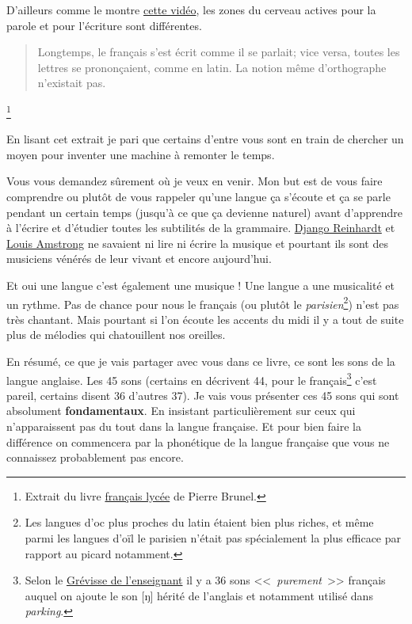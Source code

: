 \documentclass[12pt,a4paper]{book}
\begin{document}
D'ailleurs comme le montre \href{https://youtu.be/Wn\_eBrIDUuc}{cette vidéo}, les zones du cerveau actives
pour la parole et pour l'écriture sont différentes.\par

\begin{quote}
Longtemps, le français s'est écrit comme il se parlait; vice versa,
toutes les lettres se prononçaient, comme en latin. La notion même
d'orthographe n'existait pas.
\end{quote}\footnote{Extrait du livre
\href{https://www.amazon.fr/gp/product/2844100015/ref=as\_li\_tl?ie=UTF8\&camp=1642\&creative=6746\&creativeASIN=2844100015\&linkCode=as2\&tag=wwwbecomefree-21\&linkId=985f3a849fd44728e8480993cf2d5490}{français
  lycée} de Pierre Brunel.}


En lisant cet extrait je pari que certains d'entre vous sont en train
de chercher un moyen pour inventer une machine à remonter le temps. 

Vous vous demandez sûrement où je veux en venir. Mon but est de vous
faire comprendre ou plutôt de vous rappeler qu'une langue ça s'écoute
et ça se parle pendant un certain temps (jusqu'à ce que ça devienne
naturel) avant d'apprendre à l'écrire et d'étudier toutes les
subtilités de la grammaire. \href{https://fr.wikipedia.org/wiki/Django\_Reinhardt}{Django Reinhardt} et \href{https://fr.wikipedia.org/wiki/Louis\_Armstrong}{Louis Amstrong} ne
savaient ni lire ni écrire la musique et pourtant ils sont des
musiciens vénérés de leur vivant et encore aujourd'hui.\par

Et oui une langue c'est également une musique ! Une langue a une
musicalité et un rythme. Pas de chance pour nous le français (ou
plutôt le \emph{parisien}\footnote{Les langues d'oc plus proches du
  latin étaient bien plus riches, et même parmi les langues d'oïl le
  parisien n'était pas spécialement la plus efficace par rapport au
  picard notamment.})
n'est pas très chantant. Mais pourtant si l'on écoute les accents du
midi il y a tout de suite plus de mélodies qui chatouillent nos
oreilles. 

En résumé, ce que je vais partager avec vous dans ce livre, ce
sont les sons de la langue anglaise. Les 45 sons (certains en
décrivent 44, pour le français\footnote{Selon le
  \href{https://www.amazon.fr/gp/product/221010632X/ref=as_li_tl?ie=UTF8&camp=1642&creative=6746&creativeASIN=221010632X&linkCode=as2&tag=wwwbecomefree-21&linkId=c8c522ee07ffc9188dd9a768e39d88e0}{Grévisse
  de l'enseignant} il y a 36 sons <<~\emph{purement}~>> français
auquel on ajoute le son [ŋ] hérité de l'anglais et notamment utilisé dans \emph{parking}.} c'est pareil, certains disent 36
d'autres 37). Je vais vous présenter ces 45 sons qui sont absolument
\textbf{fondamentaux}. En insistant particulièrement sur ceux qui
n'apparaissent pas du tout dans la langue française. Et pour bien
faire la différence on commencera par la phonétique de la langue
française que vous ne connaissez probablement pas encore.\par
\end{document}
